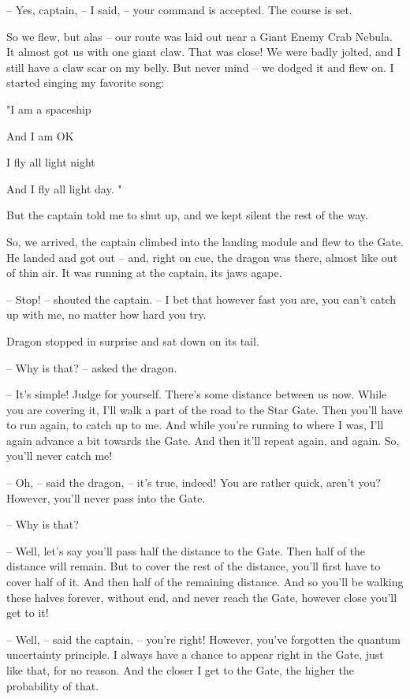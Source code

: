 \documentclass[ebook,twoside,final,openright]{memoir}
\begin{document}
– Yes, captain, – I said, – your command is accepted. The course is set.\par
So we flew, but alas – our route was laid out near a Giant Enemy Crab Nebula. It almost got us with one giant claw. That was close! We were badly jolted, and I still have a claw scar on my belly. But never mind – we dodged it and flew on. I started singing my favorite song: \par
"I am a spaceship \par
 And I am OK \par
 I fly all light night \par
 And I fly all light day. "\par
 But the captain told me to shut up, and we kept silent the rest of the way.\par
\par
So, we arrived, the captain climbed into the landing module and flew to the Gate. He landed and got out – and, right on cue, the dragon was there, almost like out of thin air. It was running at the captain, its jaws agape.\par
– Stop! – shouted the captain. – I bet that however fast you are, you can’t catch up with me, no matter how hard you try.\par
Dragon stopped in surprise and sat down on its tail.\par
– Why is that? – asked the dragon.\par
– It’s simple! Judge for yourself. There’s some distance between us now. While you are covering it, I’ll walk a part of the road to the Star Gate. Then you’ll have to run again, to catch up to me. And while you’re running to where I was, I’ll again advance a bit towards the Gate. And then it’ll repeat again, and again. So, you’ll never catch me!\par
– Oh, – said the dragon, – it’s true, indeed! You are rather quick, aren’t you? However, you’ll never pass into the Gate.\par
– Why is that?\par
– Well, let’s say you’ll pass half the distance to the Gate. Then half of the distance will remain. But to cover the rest of the distance, you’ll first have to cover half of it. And then half of the remaining distance. And so you’ll be walking these halves forever, without end, and never reach the Gate, however close you’ll get to it!\par
– Well, – said the captain, – you’re right! However, you’ve forgotten the quantum uncertainty principle. I always have a chance to appear right in the Gate, just like that, for no reason. And the closer I get to the Gate, the higher the probability of that.\par
\end{document}
